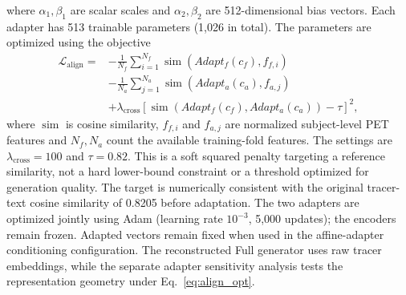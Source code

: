 where $\alpha_1,\beta_1$ are scalar scales and $\alpha_2,\beta_2$ are 512-dimensional bias vectors. Each adapter has 513 trainable parameters (1,026 in total). The parameters are optimized using the objective
\begin{equation}
\begin{aligned}
\mathcal{L}_{\mathrm{align}}={}&-\frac{1}{N_f}\sum_{i=1}^{N_f}\operatorname{sim}(Adapt_f(c_f),f_{f,i})\\
&-\frac{1}{N_a}\sum_{j=1}^{N_a}\operatorname{sim}(Adapt_a(c_a),f_{a,j})\\
&+\lambda_{\mathrm{cross}}\left[\operatorname{sim}(Adapt_f(c_f),Adapt_a(c_a))-\tau\right]^2,
\end{aligned}
\label{eq:align_opt}
\end{equation}
where $\operatorname{sim}$ is cosine similarity, $f_{f,i}$ and $f_{a,j}$ are normalized subject-level PET features and $N_f,N_a$ count the available training-fold features. The settings are $\lambda_{\mathrm{cross}}=100$ and $\tau=0.82$. This is a soft squared penalty targeting a reference similarity, not a hard lower-bound constraint or a threshold optimized for generation quality. The target is numerically consistent with the original tracer-text cosine similarity of 0.8205 before adaptation. The two adapters are optimized jointly using Adam (learning rate $10^{-3}$, 5,000 updates); the encoders remain frozen. Adapted vectors remain fixed when used in the affine-adapter conditioning configuration. The reconstructed Full generator uses raw tracer embeddings, while the separate adapter sensitivity analysis tests the representation geometry under Eq.~\eqref{eq:align_opt}.
